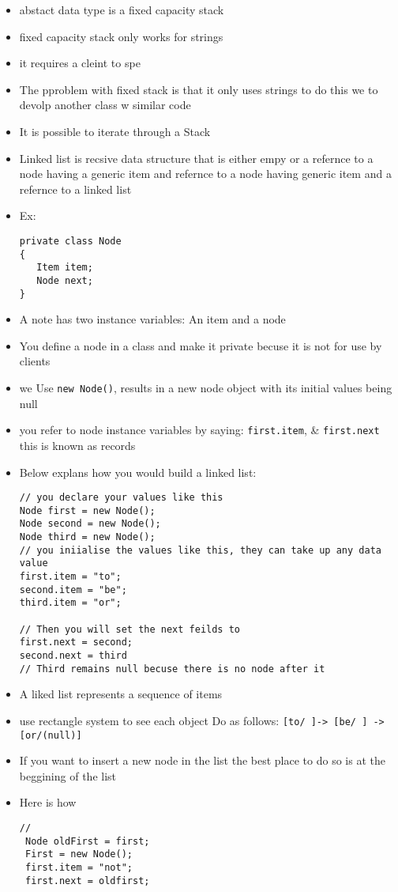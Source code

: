 \documentclass[11pt]{report}
\begin{document}
\begin{itemize}
\begin{verbatim}
\end{verbatim}
\item abstact data type is a fixed capacity stack
\item fixed capacity stack only works for strings
\item it requires a cleint to spe
\item The pproblem with fixed stack is that it only uses strings
to do this we to devolp another class w similar code
\item It is possible to iterate through a Stack
\item Linked list is recsive data structure that is either empy or a refernce to a
node having a generic item and refernce to a node having generic item and
a refernce to a linked list
\item Ex:
\begin{verbatim}
private class Node
{
   Item item;
   Node next;
}
\end{verbatim}
\item A note has two instance variables: An item and a node
\item You define a node in a class and make it private becuse it is not for use by clients
\item we Use \texttt{new Node()}, results in a new node object with its initial values being null
\item you refer to node instance variables by saying: \texttt{first.item}, \& \texttt{first.next} this
is known as records
\item Below explans how you would build a linked list:
\begin{verbatim}
// you declare your values like this
Node first = new Node();
Node second = new Node();
Node third = new Node();
// you iniialise the values like this, they can take up any data value
first.item = "to";
second.item = "be";
third.item = "or";

// Then you will set the next feilds to
first.next = second;
second.next = third
// Third remains null becuse there is no node after it 
\end{verbatim}
\item A liked list represents a sequence of items
\item use rectangle system to see each object
Do as follows: \texttt{[to/ ]-> [be/ ] -> [or/(null)]}
\item If you want to insert a new node in the list the best place to do so
is at the beggining of the list
\item Here is how
\begin{verbatim}
// 
 Node oldFirst = first;
 First = new Node();
 first.item = "not";
 first.next = oldfirst;


\end{verbatim}
\end{itemize}
\end{document}
